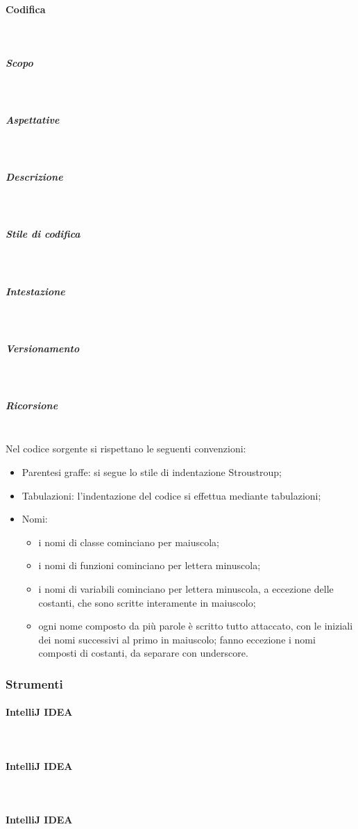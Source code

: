 \paragraph{Codifica} \mbox{}\\
\subparagraph{Scopo} \mbox{}\\
\subparagraph{Aspettative} \mbox{}\\
\subparagraph{Descrizione} \mbox{}\\
\subparagraph{Stile di codifica} \mbox{}\\
\subparagraph{Intestazione} \mbox{}\\
\subparagraph{Versionamento} \mbox{}\\
\subparagraph{Ricorsione} \mbox{}\\
Nel codice sorgente si rispettano le seguenti convenzioni:
\begin{itemize}
	\item Parentesi graffe: si segue lo stile di indentazione Stroustroup;
	\item Tabulazioni: l'indentazione del codice si effettua mediante tabulazioni;
	\item Nomi: 
	\begin{itemize}
		\item i nomi di classe cominciano per maiuscola;
		\item i nomi di funzioni cominciano per lettera minuscola;
		\item i nomi di variabili cominciano per lettera minuscola, a eccezione delle costanti, che sono scritte interamente in maiuscolo;
		\item ogni nome composto da più parole è scritto tutto attaccato, con le iniziali dei nomi successivi al primo in maiuscolo; fanno 							eccezione i nomi composti di costanti, da separare con underscore.
	\end{itemize}
\end{itemize}
\subsubsection{Strumenti}
\paragraph{IntelliJ IDEA} \mbox{}\\
\paragraph{IntelliJ IDEA} \mbox{}\\
\paragraph{IntelliJ IDEA} \mbox{}\\